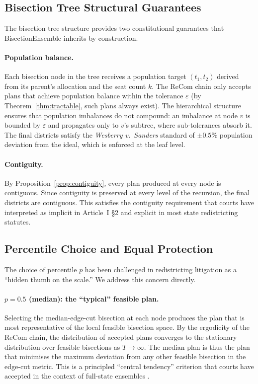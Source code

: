 \subsection{Bisection Tree Structural Guarantees}
\label{sec:legal:structure}

The bisection tree structure provides two constitutional guarantees that
BisectionEnsemble inherits by construction.

\paragraph{Population balance.}
Each bisection node in the tree receives a population target $(t_1, t_2)$
derived from its parent's allocation and the seat count $k$. The ReCom chain
only accepts plans that achieve population balance within the tolerance
$\varepsilon$ (by Theorem~\ref{thm:tractable}, such plans always exist).
The hierarchical structure ensures that population imbalances do not compound:
an imbalance at node $v$ is bounded by $\varepsilon$ and propagates only to
$v$'s subtree, where sub-tolerances absorb it. The final districts satisfy
the \emph{Wesberry v.\ Sanders} standard \citep{wesberry1964} of $\pm 0.5\%$
population deviation from the ideal, which is enforced at the leaf level.

\paragraph{Contiguity.}
By Proposition~\ref{prop:contiguity}, every plan produced at every node is
contiguous. Since contiguity is preserved at every level of the recursion,
the final districts are contiguous. This satisfies the contiguity requirement
that courts have interpreted as implicit in Article~I \S2 and explicit in
most state redistricting statutes.

\subsection{Percentile Choice and Equal Protection}
\label{sec:legal:percentile}

The choice of percentile $p$ has been challenged in redistricting litigation
as a ``hidden thumb on the scale.'' We address this concern directly.

\paragraph{$p = 0.5$ (median): the ``typical'' feasible plan.}
Selecting the median-edge-cut bisection at each node produces the plan that
is most representative of the local feasible bisection space. By the
ergodicity of the ReCom chain, the distribution of accepted plans converges
to the stationary distribution over feasible bisections as $T \to \infty$.
The median plan is thus the plan that minimises the maximum deviation from
any other feasible bisection in the edge-cut metric. This is a principled
``central tendency'' criterion that courts have accepted in the context of
full-state ensembles \citep{herschlag2020quantifying}.

